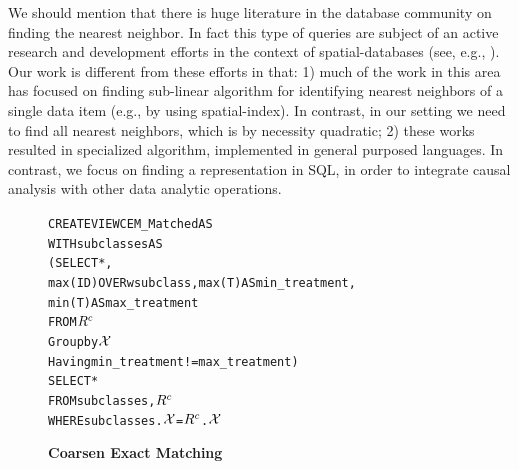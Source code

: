 {We should mention that there is huge literature in the database
community on finding the nearest neighbor. In fact this type of
queries are subject of an active research and development efforts in
the context of spatial-databases (see, e.g.,
\cite{obe2015postgis}). Our work is different from these efforts in that: 1) much of the work in this area has focused on finding sub-linear algorithm for identifying nearest neighbors of a single data item (e.g., by using spatial-index). In contrast, in our setting
we need to find all nearest neighbors, which is by necessity quadratic; 2) these works resulted in specialized algorithm,
implemented in general purposed languages. In contrast, we focus on finding a representation in SQL, in order to integrate causal
 analysis with other data analytic operations.  

}















\begin{figure}
\begin{alltt} \tiny
CREATE VIEW CEM_Matched AS
WITH subclasses AS
  (SELECT *,
          max(ID) OVER w subclass, max(T) AS min_treatment,
          min(T)AS max_treatment
   FROM \(\crele\)
   Group by \(\ccv\)
   Having min_treatment!=max_treatment)
SELECT *
FROM subclasses,\(\crele\)
WHERE subclasses.\(\ccv\)=\(\crele\).\(\ccv\)

\end{alltt}
\vspace{-.45cm}
  \caption{\bf Coarsen Exact Matching}\label{fig:cem}
\end{figure}



